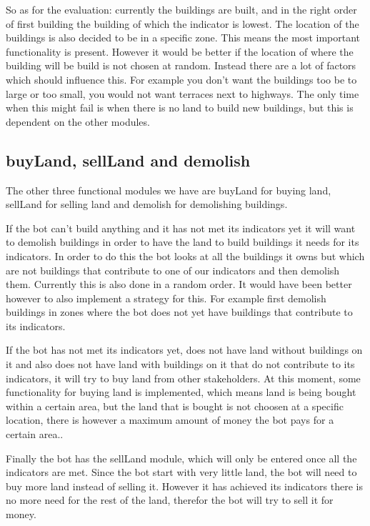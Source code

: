 So as for the evaluation: currently the buildings are built, and in the right order of first building the building of which the indicator is lowest. The location of the buildings is also decided to be in a specific zone. This means the most important functionality is present. However it would be better if the location of where the building will be build is not chosen at random. Instead there are a lot of factors which should influence this. For example you don't want the buildings too be to large or too small, you would not want terraces next to highways. The only time when this might fail is when there is no land to build new buildings, but this is dependent on the other modules.

\subsection{buyLand, sellLand and demolish}
The other three functional modules we have are buyLand for buying land, sellLand for selling land and demolish for demolishing buildings. 

If the bot can't build anything and it has not met its indicators yet it will want to demolish buildings in order to have the land to build buildings it needs for its indicators. In order to do this the bot looks at all the buildings it owns but which are not buildings that contribute to one of our indicators and then demolish them. Currently this is also done in a random order. It would have been better however to also implement a strategy for this. For example first demolish buildings in zones where the bot does not yet have buildings that contribute to its indicators. 

If the bot has not met its indicators yet, does not have land without buildings on it and also does not have land with buildings on it that do not contribute to its indicators, it will try to buy land from other stakeholders. At this moment, some functionality for buying land is implemented, which means land is being bought within a certain area, but the land that is bought is not choosen at a specific location, there is however a maximum amount of money the bot pays for a certain area..

Finally the bot has the sellLand module, which will only be entered once all the indicators are met. Since the bot start with very little land, the bot will need to buy more land instead of selling it. However it has achieved its indicators there is no more need for the rest of the land, therefor the bot will try to sell it for money.

